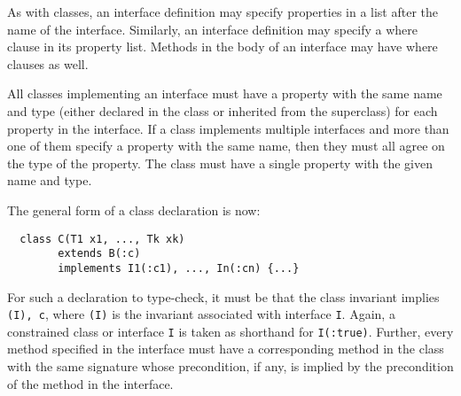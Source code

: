 As with classes, an interface definition may specify properties
in a 
list after the name of the interface. Similarly, an interface
definition may specify a where clause in its property list. Methods
in the body of an interface may have where clauses
as well.

All classes implementing an interface must have a property
with the same name and
type (either declared in the class or inherited from the superclass)
for each property in the interface. If a class implements
multiple interfaces and more than one of them specify a property
with the same name, then they must all agree on the type of the
property. The class must have a single property with the given name
and type.

The general form of a class declaration is now:
\begin{verbatim}
  class C(T1 x1, ..., Tk xk)
        extends B(:c)
        implements I1(:c1), ..., In(:cn) {...}
\end{verbatim}
\noindent

For such a declaration to type-check, it must be that the class
invariant implies {\tt \inv(I), c}, where {\tt \inv(I)} is the
invariant associated with interface {\tt I}.  Again, a constrained
class or interface {\tt I} is taken as shorthand for {\tt I(:true)}.
Further, every method specified in the interface must have a
corresponding method in the class with the same signature whose
precondition, if any, is implied by the precondition of the method in
the interface.



